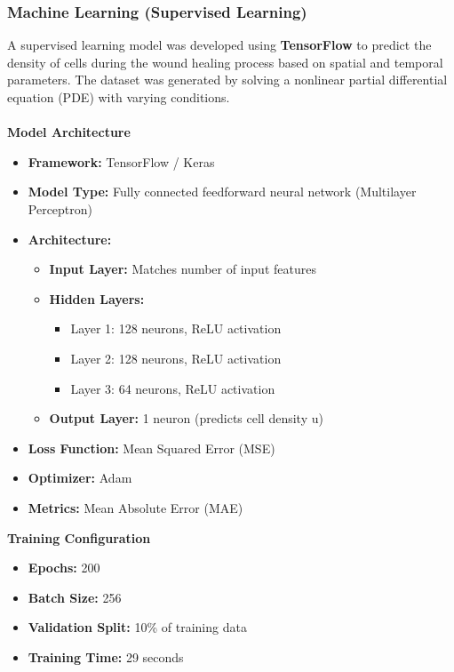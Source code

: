 \documentclass[conference]{IEEEtran}
\begin{document}
\subsubsection{\textbf{Machine Learning (Supervised Learning)}}
A supervised learning model was developed using \textbf{TensorFlow} to predict the density of cells during the wound healing process based on spatial and temporal parameters. The dataset was generated by solving a nonlinear partial differential equation (PDE) with varying conditions. \\ \\
\textbf{Model Architecture}
\begin{itemize}
    \item \textbf{Framework:} TensorFlow / Keras
    \item \textbf{Model Type:} Fully connected feedforward neural network (Multilayer Perceptron)
    \item \textbf{Architecture:}  
    \begin{itemize}
        \item \textbf{Input Layer:} Matches number of input features
        \item \textbf{Hidden Layers:}
        \begin{itemize}
            \item Layer 1: 128 neurons, ReLU activation
            \item Layer 2: 128 neurons, ReLU activation
            \item Layer 3: 64 neurons, ReLU activation
        \end{itemize}
        \item \textbf{Output Layer:} 1 neuron (predicts cell density u)
    \end{itemize}
    \item \textbf{Loss Function:} Mean Squared Error (MSE)
    \item \textbf{Optimizer:} Adam
    \item \textbf{Metrics:} Mean Absolute Error (MAE)
\end{itemize}
\textbf{Training Configuration}
\begin{itemize}
    \item \textbf{Epochs:} 200
    \item \textbf{Batch Size:} 256
    \item \textbf{Validation Split:} 10\% of training data
    \item \textbf{Training Time:} 29 seconds
\end{itemize}
\end{document}

